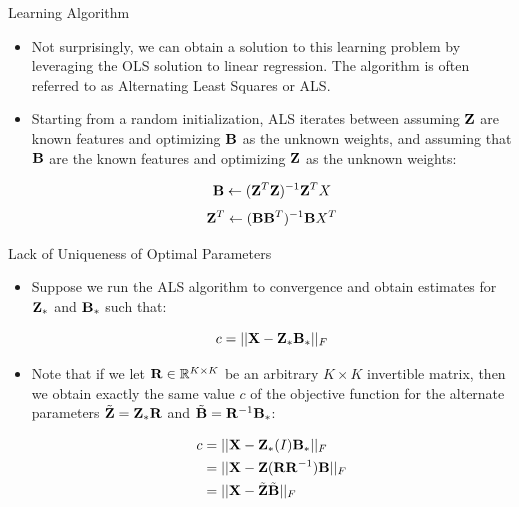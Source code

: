 \documentclass[serif,xcolor=pdftex,dvipsnames,table,hyperref={bookmarks=false,breaklinks}]{beamer}
\begin{document}
\begin{frame}[t]{Learning Algorithm}
 
\begin{itemize}
\item Not surprisingly, we can obtain a solution to this learning problem by
leveraging the OLS solution to linear regression. The algorithm is often 
referred to as Alternating Least Squares or ALS. 

\pause\item Starting from a random initialization, ALS iterates between 
assuming ${\mathbf{Z}}$ are known features and optimizing ${\mathbf{B}}$ 
as the unknown weights, and assuming that ${\mathbf{B}}$ are the known features and 
optimizing ${\mathbf{Z}}$ as the unknown weights:


{\Large
$${\mathbf{B}} \leftarrow ({\mathbf{Z}}^T{\mathbf{Z}})^{-1}{\mathbf{Z}}^TX$$
$${\mathbf{Z}}^T \leftarrow ({\mathbf{B}}{\mathbf{B}}^T)^{-1}{\mathbf{B}}X^T$$
}

\end{itemize} 
\end{frame}

\begin{frame}[t]{Lack of Uniqueness of Optimal Parameters}
 
\begin{itemize}
\item Suppose we run the ALS algorithm to convergence and obtain estimates
for ${\mathbf{Z}}_*$ and ${\mathbf{B}}_*$ such that:

$$c = ||{\mathbf{X}} - {\mathbf{Z}}_*{\mathbf{B}}_*||_F$$

\pause\item Note that if we let ${\mathbf{R}} \in \mathbb{R}^{K\times K}$ be an 
arbitrary $K\times K$ invertible matrix, then we obtain exactly the same value 
$c$ of the objective function for the alternate parameters 
$\tilde{{\mathbf{Z}}}={\mathbf{Z}}_*{\mathbf{R}}$ and $\tilde{{\mathbf{B}}} = 
{\mathbf{R}}^{-1}{\mathbf{B}}_*$:

\begin{align*}
c &= ||{\mathbf{X}} - {\mathbf{Z}}_*(I){\mathbf{B}}_*||_F\\
 &= ||{\mathbf{X}} - {\mathbf{Z}}({\mathbf{R}}{\mathbf{R}}^{-1}){\mathbf{B}} ||_F\\
 &= ||{\mathbf{X}} - \tilde{{\mathbf{Z}}}\tilde{{\mathbf{B}}} ||_F
\end{align*}

\end{itemize} 
\end{frame}
\end{document}

